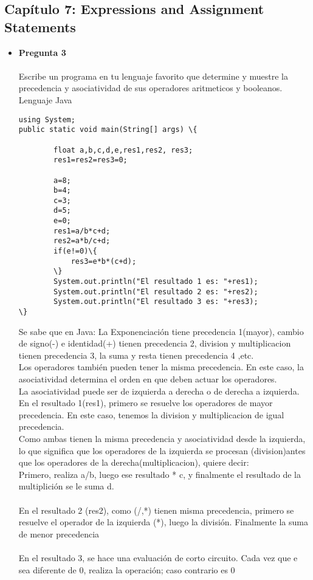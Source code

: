 \documentclass[12pt,oneside]{article}
\begin{document}
\subsection{Capítulo 7: Expressions and Assignment Statements}


\begin{itemize}
\item {\bf Pregunta 3} \\\\
Escribe un programa en tu lenguaje favorito que determine y muestre la precedencia y asociatividad de sus operadores aritmeticos y booleanos.\\
Lenguaje Java\\
\begin{lstlisting}[frame=single]  % Start your code-block
using System;
public static void main(String[] args) \{
        
        float a,b,c,d,e,res1,res2, res3;
        res1=res2=res3=0;
        
        a=8;
        b=4;
        c=3;
        d=5;
        e=0;
        res1=a/b*c+d;
        res2=a*b/c+d;
        if(e!=0)\{
            res3=e*b*(c+d);
        \}
        System.out.println("El resultado 1 es: "+res1);
        System.out.println("El resultado 2 es: "+res2);
        System.out.println("El resultado 3 es: "+res3);
\}

\end{lstlisting}

Se sabe que en Java: La Exponenciación tiene precedencia 1(mayor), cambio de signo(-) e identidad(+) tienen precedencia 2, division y multiplicacion tienen precedencia 3, la suma y resta tienen precedencia 4 ,etc.\\
Los operadores también pueden tener la misma precedencia. En este caso, la asociatividad determina el orden en que deben actuar los operadores. \\
La asociatividad puede ser de izquierda a derecha o de derecha a izquierda.\\
En el resultado 1(res1), primero se resuelve los operadores de mayor precedencia. En este caso, tenemos la division y multiplicacion de igual precedencia.\\
Como ambas tienen la misma precedencia y asociatividad desde la izquierda, lo que significa que los operadores de la izquierda se procesan (division)antes que los operadores de la derecha(multiplicacion), quiere decir:\\
Primero, realiza a/b, luego ese resultado * c, y finalmente el resultado de la multiplición se le suma d. \\\\
En el resultado 2 (res2), como (/,*) tienen misma precedencia, primero se resuelve el operador de la izquierda (*), luego la división. Finalmente la suma de menor precedencia\\\\
En el resultado 3, se hace una evaluación de corto circuito. Cada vez que e sea diferente de 0, realiza la operación; caso contrario es 0\\\\\\


\end{itemize}
\end{document}
